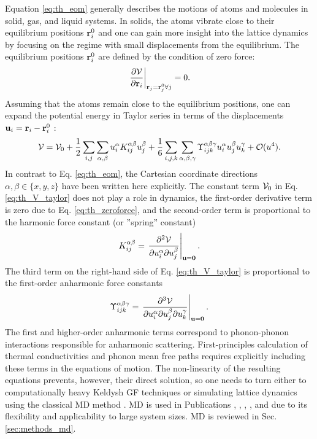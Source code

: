 Equation \eqref{eq:th_eom} generally describes the motions of atoms and molecules in solid, gas, and liquid systems. In solids, the atoms vibrate close to their equilibrium positions $\mathbf{r}_i^0$ and one can gain more insight into the lattice dynamics by focusing on the regime with small displacements from the equilibrium. The equilibrium positions $\mathbf{r}_i^0$ are defined by the condition of zero force:
\begin{equation}
 \left. \frac{\partial \mathcal{V}}{\partial \mathbf{r}_i} \right|_{\mathbf{r}_j=\mathbf{r}_j^0 \forall j} = 0. \label{eq:th_zeroforce}
\end{equation}
Assuming that the atoms remain close to the equilibrium positions, one can expand the potential energy in Taylor series in terms of the displacements $\mathbf{u}_i=\mathbf{r}_i-\mathbf{r}_i^0$ \cite{ziman}:
\begin{equation}
 \ca{V} = \ca{V}_0 + \frac{1}{2} \sum_{i,j} \sum_{\alpha,\beta} u_i^{\alpha} K_{ij}^{\alpha \beta} u_j^{\beta}  + \frac{1}{6} \sum_{i,j,k} \sum_{\alpha,\beta,\gamma} \Upsilon_{ijk}^{\alpha\beta\gamma}  u_i^{\alpha} u_j^{\beta} u_k^{\gamma} + \mathcal{O}(u^4). \label{eq:th_V_taylor} %
\end{equation}
In contrast to Eq. \eqref{eq:th_eom}, the Cartesian coordinate directions $\alpha,\beta \in \{x,y,z\}$ have been written here explicitly. The constant term $\mathcal{V}_0$ in Eq. \eqref{eq:th_V_taylor} does not play a role in dynamics, the first-order derivative term is zero due to Eq. \eqref{eq:th_zeroforce}, and the second-order term is proportional to the harmonic force constant (or ''spring'' constant) \cite{ziman}
\begin{equation}
 K_{ij}^{\alpha\beta} = \left. \frac{\partial^2 \mathcal{V}}{\partial u_i^{\alpha} \partial u_j^{\beta}} \right|_{\mathbf{u}=\mathbf{0}}. \label{eq:th_K_def}
\end{equation}
The third term on the right-hand side of Eq. \eqref{eq:th_V_taylor} is proportional to the first-order anharmonic force constants
\begin{equation}
 \Upsilon_{ijk}^{\alpha\beta\gamma} = \left. \frac{\partial^3 \mathcal{V}}{\partial u_i^{\alpha} \partial u_j^{\beta} \partial u_k^{\gamma}} \right|_{\mathbf{u}=\mathbf{0}}.
\end{equation}
The first and higher-order anharmonic terms correspond to phonon-phonon interactions \cite{ziman} responsible for anharmonic scattering. First-principles calculation of thermal conductivities and phonon mean free paths requires explicitly including these terms in the equations of motion. The non-linearity of the resulting equations prevents, however, their direct solution, so one needs to turn either to computationally heavy Keldysh GF techniques \cite{wang08} or simulating lattice dynamics using the classical MD method \cite{allentildesley}. MD is used in Publications , , , , and  due to its flexibility and applicability to large system sizes. MD is reviewed in Sec. \ref{sec:methods_md}.

